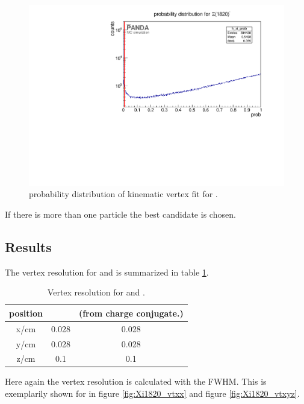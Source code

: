		\begin{figure}
			\centering
			\includegraphics[width=1.\textwidth]{./plots/Xi1820/XiMinus1820_prob.pdf}
			\caption{\propose \chisq probability distribution of kinematic vertex fit for \excitedcascade.}
			\label{fig:xi1820_prob}
		\end{figure}
		
		If there is more than one particle the best candidate is chosen.
		
	\subsection*{Results}
	The vertex resolution for \excitedcascade and \excitedanticascade is summarized in table \ref{tab:Xi1820_vtxres}.
	
	\begin{table}
		\centering
		\caption{\propose Vertex resolution for \excitedcascade and \excitedanticascade.}
		\label{tab:Xi1820_vtxres}
		\begin{tabular}{ccc}
			\hline
			position & \excitedcascade & \excitedanticascade (from charge conjugate.) \\
			\hline
			\hline
			x/cm & 0.028 & 0.028\\
			y/cm & 0.028 & 0.028\\
			z/cm & 0.1 & 0.1\\
			\hline
			 
		\end{tabular}
	\end{table}
	
	Here again the vertex resolution is calculated with the FWHM. 
	This is exemplarily shown for \excitedcascade in figure \ref{fig:Xi1820_vtxx} and figure \ref{fig:Xi1820_vtxyz}.
	
